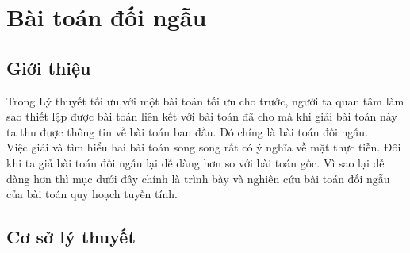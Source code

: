 \documentclass{article}
\begin{document}
\section{Bài toán đối ngẫu}
    \subsection{Giới thiệu}
        Trong Lý thuyết tối ưu,với một bài toán tối ưu cho trước, người ta quan tâm làm sao thiết lập được bài toán liên kết với bài toán đã cho mà khi giải bài toán này ta thu được thông tin về bài toán ban đầu. Đó chíng là bài toán đối ngẫu. \\
        Việc giải và tìm hiểu hai bài toán song song rất có ý nghĩa về mặt thực tiễn. Đôi khi ta giả bài toán đối ngẫu lại dễ dàng hơn so với bài toán gốc. Vì sao lại dễ dàng hơn thì mục dưới đây chính là trình bày và nghiên cứu bài toán đối ngẫu của bài toán quy hoạch tuyến tính.
    \subsection{Cơ sở lý thuyết}
\end{document}

